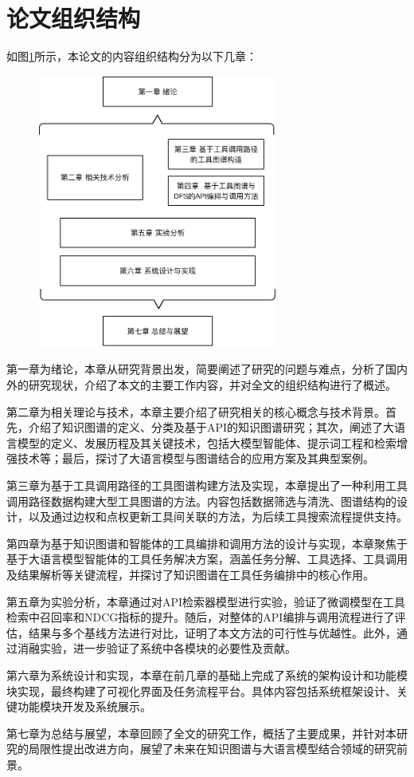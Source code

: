 \section{论文组织结构}

如图\ref{fig:ch1-structure}所示，本论文的内容组织结构分为以下几章：

\begin{figure}[!htp]
    \vspace{1em}
    \centering
    \setlength{\abovecaptionskip}{10pt} %
    \includegraphics[height=9cm]{../assets/ch1-论文结构.pdf}
    \label{fig:ch1-structure}
  \end{figure}

  \indent 第一章为绪论，本章从研究背景出发，简要阐述了研究的问题与难点，分析了国内外的研究现状，介绍了本文的主要工作内容，并对全文的组织结构进行了概述。

  \indent 第二章为相关理论与技术，本章主要介绍了研究相关的核心概念与技术背景。首先，介绍了知识图谱的定义、分类及基于API的知识图谱研究；其次，阐述了大语言模型的定义、发展历程及其关键技术，包括大模型智能体、提示词工程和检索增强技术等；最后，探讨了大语言模型与图谱结合的应用方案及其典型案例。
  
  \indent 第三章为基于工具调用路径的工具图谱构建方法及实现，本章提出了一种利用工具调用路径数据构建大型工具图谱的方法。内容包括数据筛选与清洗、图谱结构的设计，以及通过边权和点权更新工具间关联的方法，为后续工具搜索流程提供支持。
  
  \indent 第四章为基于知识图谱和智能体的工具编排和调用方法的设计与实现，本章聚焦于基于大语言模型智能体的工具任务解决方案，涵盖任务分解、工具选择、工具调用及结果解析等关键流程，并探讨了知识图谱在工具任务编排中的核心作用。
  
  \indent 第五章为实验分析，本章通过对API检索器模型进行实验，验证了微调模型在工具检索中召回率和NDCG指标的提升。随后，对整体的API编排与调用流程进行了评估，结果与多个基线方法进行对比，证明了本文方法的可行性与优越性。此外，通过消融实验，进一步验证了系统中各模块的必要性及贡献。
  
  \indent 第六章为系统设计和实现，本章在前几章的基础上完成了系统的架构设计和功能模块实现，最终构建了可视化界面及任务流程平台。具体内容包括系统框架设计、关键功能模块开发及系统展示。
  
  \indent 第七章为总结与展望，本章回顾了全文的研究工作，概括了主要成果，并针对本研究的局限性提出改进方向，展望了未来在知识图谱与大语言模型结合领域的研究前景。